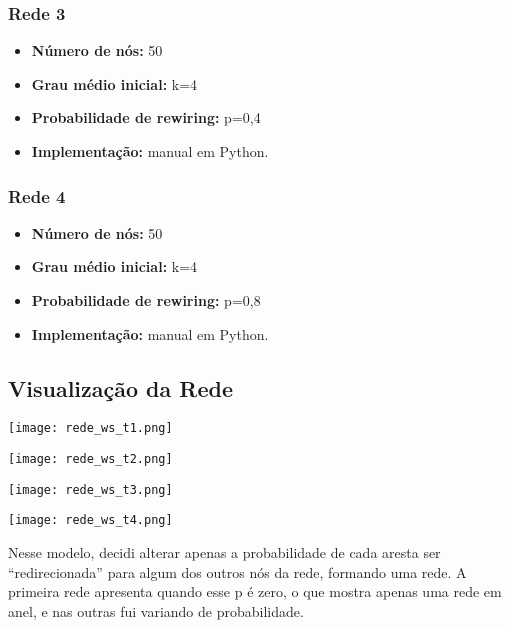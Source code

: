 \documentclass[a4paper]{article}
\begin{document}
\subsubsection{Rede 3}
\begin{itemize}
\item \textbf{Número de nós:} 50
\item \textbf{Grau médio inicial:} k=4
\item \textbf{Probabilidade de rewiring:} p=0,4
\item \textbf{Implementação:} manual em Python.
\end{itemize}

\subsubsection{Rede 4}
\begin{itemize}
\item \textbf{Número de nós:} 50
\item \textbf{Grau médio inicial:} k=4
\item \textbf{Probabilidade de rewiring:} p=0,8
\item \textbf{Implementação:} manual em Python.
\end{itemize}

\subsection*{Visualização da Rede}

\begin{center}
\texttt{[image: rede\_ws\_t1.png]}
\end{center}

\begin{center}
\texttt{[image: rede\_ws\_t2.png]}
\end{center}

\begin{center}
\texttt{[image: rede\_ws\_t3.png]}
\end{center}

\begin{center}
\texttt{[image: rede\_ws\_t4.png]}
\end{center}

Nesse modelo, decidi alterar apenas a probabilidade de cada aresta ser “redirecionada” para algum dos outros nós da rede, formando uma rede. A primeira rede apresenta quando esse p é zero, o que mostra apenas uma rede em anel, e nas outras fui variando de probabilidade.
\end{document}
